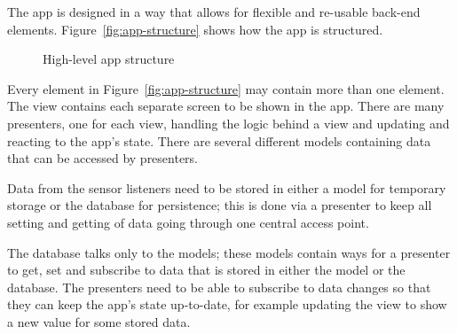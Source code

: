 The app is designed in a way that allows for flexible and re-usable back-end elements. Figure~\vref{fig:app-structure} shows how the app is structured.

\begin{figure}[ht]
  \centering
  \begin{scaletikzpicturetowidth}{\linewidth}
  \end{scaletikzpicturetowidth}
  \caption{High-level app structure}\label{fig:app-structure}
\end{figure}

Every element in Figure~\vref{fig:app-structure} may contain more than one element. The view contains each separate screen to be shown in the app. There are many presenters, one for each view, handling the logic behind a view and updating and reacting to the app's state. There are several different models containing data that can be accessed by presenters.

Data from the sensor listeners need to be stored in either a model for temporary storage or the database for persistence; this is done via a presenter to keep all setting and getting of data going through one central access point.

The database talks only to the models; these models contain ways for a presenter to get, set and subscribe to data that is stored in either the model or the database. The presenters need to be able to subscribe to data changes so that they can keep the app's state up-to-date, for example updating the view to show a new value for some stored data.

